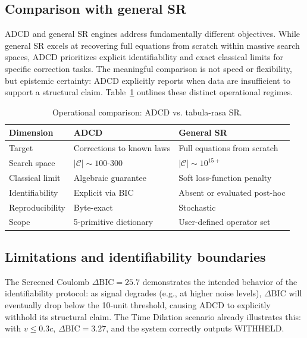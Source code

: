 ﻿\documentclass{article}
\begin{document}
\subsection{Comparison with general SR}

ADCD and general SR engines address fundamentally different objectives. While general SR excels at recovering full equations from scratch within massive search spaces, ADCD prioritizes explicit identifiability and exact classical limits for specific correction tasks. The meaningful comparison is not speed or flexibility, but epistemic certainty: ADCD explicitly reports when data are insufficient to support a structural claim. Table~\ref{tab:comparison} outlines these distinct operational regimes.

\begin{table}[ht]
\small
\caption{Operational comparison: ADCD vs. tabula-rasa SR.}
\label{tab:comparison}
\centering
\begin{tabular}{@{}p{2.4cm}p{3cm}p{4cm}@{}}
\toprule
Dimension & ADCD & General SR \\
\midrule
Target & Corrections to known laws & Full equations from scratch \\
Search space & $|\mathcal{C}| \sim 100\text{-}300$ & $|\mathcal{C}| \sim 10^{15+}$ \\
Classical limit & Algebraic guarantee & Soft loss-function penalty \\
Identifiability & Explicit via BIC & Absent or evaluated post-hoc \\
Reproducibility & Byte-exact & Stochastic \\
Scope & 5-primitive dictionary & User-defined operator set \\
\bottomrule
\end{tabular}
\end{table}

\subsection{Limitations and identifiability boundaries}
\label{sec:limitations}

  The Screened Coulomb $\Delta\mathrm{BIC} = 25.7$ demonstrates the intended behavior of the identifiability protocol: as signal degrades (e.g., at higher noise levels), $\Delta\mathrm{BIC}$ will eventually drop below the 10-unit threshold, causing ADCD to explicitly withhold its structural claim. The Time Dilation scenario already illustrates this: with $v \le 0.3c$, $\Delta\mathrm{BIC} = 3.27$, and the system correctly outputs WITHHELD.
\end{document}
